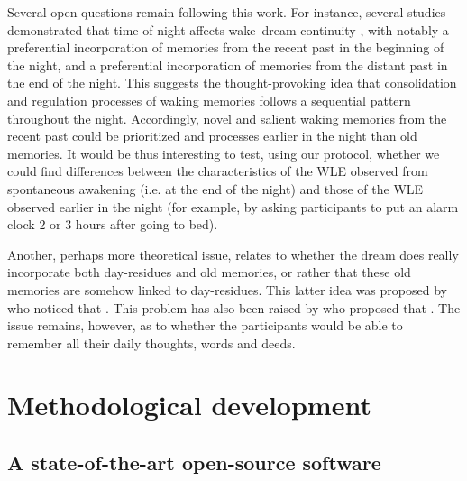 Several open questions remain following this work. For instance, several studies demonstrated that time of night affects wake–dream continuity \citep{roffwarg_effects_1978, malinowski_effect_2014}, with notably a preferential incorporation of memories from the recent past in the beginning of the night, and a preferential incorporation of memories from the distant past in the end of the night. This suggests the thought-provoking idea that consolidation and regulation processes of waking memories follows a sequential pattern throughout the night. Accordingly, novel and salient waking memories from the recent past could be prioritized and processes earlier in the night than old memories. It would be thus interesting to test, using our protocol, whether we could find differences between the characteristics of the WLE observed from spontaneous awakening (i.e. at the end of the night) and those of the WLE observed earlier in the night (for example, by asking participants to put an alarm clock 2 or 3 hours after going to bed).

Another, perhaps more theoretical issue, relates to whether the dream does really incorporate both day-residues and old memories, or rather that these old memories are somehow linked to day-residues. This latter idea was proposed by \citet{freud_interpretation_1900} who noticed that  \citep{marquardt_empirical_1996}. This problem has also been raised by \citet{grenier_temporal_2005} who proposed that . The issue remains, however, as to whether the participants would be able to remember all their daily thoughts, words and deeds.

\cleardoublepage
\chapter{Methodological development}
\label{disc:methods}

\section{A state-of-the-art open-source software}
\label{disc:methods:software}

